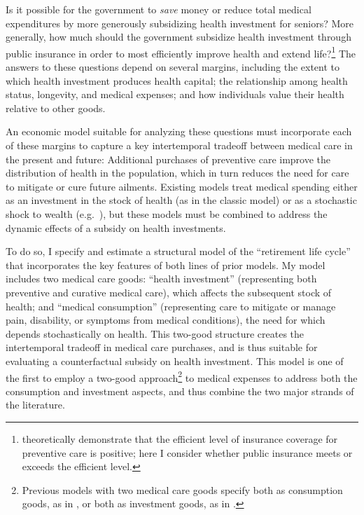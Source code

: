 \documentclass[12pt,pdftex,letterpaper]{article}
\begin{document}
Is it possible for the government to \textit{save} money or reduce total medical expenditures by more generously subsidizing health investment for seniors?  More generally, how much should the government subsidize health investment through public insurance in order to most efficiently improve health and extend life?\footnote{\cite{ellis07} theoretically demonstrate that the efficient level of insurance coverage for preventive care is positive; here I consider whether public insurance meets or exceeds the efficient level.}  The answers to these questions depend on several margins, including the extent to which health investment produces health capital; the relationship among health status, longevity, and medical expenses; and how individuals value their health relative to other goods.

An economic model suitable for analyzing these questions must incorporate each of these margins to capture a key intertemporal tradeoff between medical care in the present and future: Additional purchases of preventive care improve the distribution of health in the population, which in turn reduces the need for care to mitigate or cure future ailments.  Existing models treat medical spending either as an investment in the stock of health (as in the classic \cite{grossman72} model) or as a stochastic shock to wealth (e.g.\ \cite{dinardi10}), but these models must be combined to address the dynamic effects of a subsidy on health investments.

To do so, I specify and estimate a structural model of the ``retirement life cycle'' that incorporates the key features of both lines of prior models.  My model includes two medical care goods: ``health investment'' (representing both preventive and curative medical care), which affects the subsequent stock of health; and ``medical consumption'' (representing care to mitigate or manage pain, disability, or symptoms from medical conditions), the need for which depends stochastically on health.  This two-good structure creates the intertemporal tradeoff in medical care purchases, and is thus suitable for evaluating a counterfactual subsidy on health investment.  This model is one of the first to employ a two-good approach\footnote{Previous models with two medical care goods specify both as consumption goods, as in \cite{blau08}, or both as investment goods, as in \cite{ozkan14}.} to medical expenses to address both the consumption and investment aspects, and thus combine the two major strands of the literature.
\end{document}
